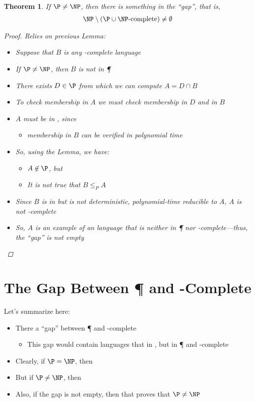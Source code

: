\documentclass[a4paper]{report}
\newtheorem{theo}{Theorem}
\theoremstyle{definition}
\begin{document}
\begin{theo}
If $\P \neq \NP$, then there is something in the ``gap'', that is,
\begin{align*}
\NP \setminus (\P \cup \NP\text{-complete}) \neq \emptyset
\end{align*}
\begin{proof}
Relies on previous Lemma:
\begin{itemize}
\item Suppose that $B$ is any \NP-complete language
\item If $\P \neq \NP$, then $B$ is not in \P
\item There exists $D \in \P$ from which we can compute $A = D \cap B$
\item To check membership in $A$ we must check membership in $D$ {\em and} in $B$
\item $A$ must be in \NP, since
\begin{itemize}
\item membership in $B$ can be verified in polynomial time
\end{itemize}
\item So, using the Lemma, we have:
\begin{itemize}
\item $A \not\in \P$, but
\item It is not true that $B \leq_P A$
\end{itemize}
\item Since $B$ is in \NP{} but is not deterministic, polynomial-time reducible to $A$, $A$ is not \NP-complete
\item So, $A$ is an example of an \NP{} language that is neither in \P{} nor \NP-complete---thus, the ``gap'' is not empty
\end{itemize}
\end{proof}
\end{theo}

\section{The Gap Between \P{} and \NP-Complete}
Let's summarize here:
\begin{itemize}
\item There  a ``gap'' between \P{} and \NP-complete
\begin{itemize}
\item This gap would contain languages that  in \NP, but  in \P{} and  \NP-complete
\end{itemize}
\item Clearly, if $\P = \NP$, then 
\item But if $\P \neq \NP$, then ~\citep{Ladner:1975:SPT:321864.321877}
\item Also, if the gap is not empty, then that proves that $\P \neq \NP$
\end{itemize}
\end{document}
